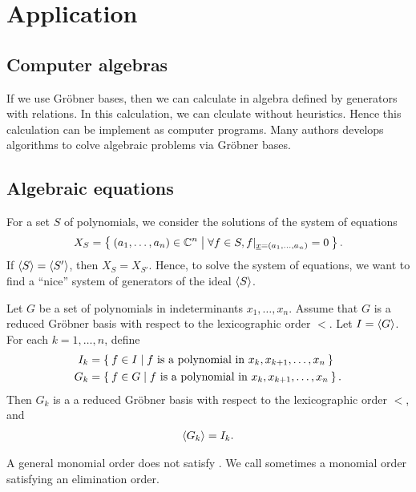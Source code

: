 \section{Application}

\subsection{Computer algebras}
If we use Gr\"obner bases,
then we can calculate in algebra defined by
generators with relations.
In this calculation,
we can clculate
without heuristics.
Hence this calculation can be implement
as computer programs.
Many authors develops algorithms
to colve algebraic problems via Gr\"obner bases.

\subsection{Algebraic equations}
For a set $S$ of polynomials,
we consider the solutions of the system of equations
\begin{align*}
  X_S=\Set{(a_1,\ldots,a_n)\in \mathbb{C}^n | \forall f\in S, f{|_{{\underline{x}}=(a_1,\ldots,a_n)}=0}}.
\end{align*}
If $\Braket{S}=\Braket{S'}$, then $X_S=X_{S'}$.
Hence, to solve the system of equations,
we want to find a ``nice'' system of generators of the ideal $\Braket{S}$.
\begin{lemma}
  \label{lem:elm}
  Let $G$ be a set of polynomials in indeterminants $x_1,\ldots,x_n$.
  Assume that $G$ is
  a reduced Gr\"obner basis with respect to
  the lexicographic order $<$.
  Let $I=\Braket{G}$.
  For each $k=1,\ldots,n$,
  define
  \begin{align*}
    I_k&=\Set{f\in I| \text{$f$ is a polynomial in $x_k,x_{k+1},\ldots,x_n$}}\\
    G_k&=\Set{f\in G| \text{$f$ is a polynomial in $x_k,x_{k+1},\ldots,x_n$}}.
  \end{align*}
  Then $G_k$ is a 
  a reduced Gr\"obner basis with respect to
  the lexicographic order $<$,
  and
  \begin{align*}
    \Braket{G_k}=I_k.
  \end{align*}
\end{lemma}

\begin{remark}
  A general monomial order does not satisfy 
  .
  We call sometimes a monomial order satisfying 
  an elimination order.
\end{remark}

